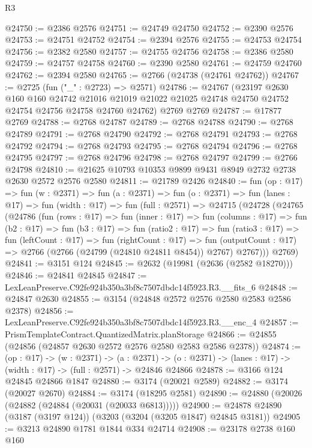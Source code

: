 \begin{lexlean}{R3}
\begin{coremodule}
@24750 := @2386 @2576
@24751 := @24749 @24750
@24752 := @2390 @2576
@24753 := @24751 @24752
@24754 := @2394 @2576
@24755 := @24753 @24754
@24756 := @2382 @2580
@24757 := @24755 @24756
@24758 := @2386 @2580
@24759 := @24757 @24758
@24760 := @2390 @2580
@24761 := @24759 @24760
@24762 := @2394 @2580
@24765 := @2766 (@24738 (@24761 @24762))
@24767 := @2725 (fun ("_" : @2723) => @2571)
@24786 := @24767
    (@23197
      @2630
      @160
      @160
      @24742
      @21016
      @21019
      @21022
      @21025
      @24748
      @24750
      @24752
      @24754
      @24756
      @24758
      @24760
      @24762)
    @2769
    @2769
@24787 := @17877 @2769
@24788 := @2768 @24787
@24789 := @2768 @24788
@24790 := @2768 @24789
@24791 := @2768 @24790
@24792 := @2768 @24791
@24793 := @2768 @24792
@24794 := @2768 @24793
@24795 := @2768 @24794
@24796 := @2768 @24795
@24797 := @2768 @24796
@24798 := @2768 @24797
@24799 := @2766 @24798
@24810 := @21625 @10793 @10353 @9899 @9431 @8949 @2732 @2738 @2630 @2572 @2576 @2580
@24811 := @21789 @2426
@24840 := fun (op : @17) =>
  fun (w : @2371) =>
  fun (a : @2371) =>
  fun (o : @2371) =>
  fun (lanes : @17) =>
  fun (width : @17) =>
  fun (full : @2571) =>
  @24715
    (@24728
      (@24765
        (@24786
          (fun (rows : @17) =>
          fun (inner : @17) =>
          fun (columns : @17) =>
          fun (b2 : @17) =>
          fun (b3 : @17) =>
          fun (ratio2 : @17) =>
          fun (ratio3 : @17) =>
          fun (leftCount : @17) =>
          fun (rightCount : @17) =>
          fun (outputCount : @17) => @2766 (@2766 (@24799 (@24810 @24811 @8454)) @2767) @2767)))
      @2769)
@24841 := @3151 @124
@24845 := @2632 (@19981 (@2636 (@2582 @18270)))
@24846 := @24841 @24845
@24847 := LexLeanPreserve.C92fe924b350a3bf8c7507dbdc14f5923.R3.__fits_6
@24848 := @24847 @2630
@24855 := @3154 (@24848 @2572 @2576 @2580 @2583 @2586 @2378)
@24856 := LexLeanPreserve.C92fe924b350a3bf8c7507dbdc14f5923.R3.__enc_4
@24857 := PrismTemplateContract.QuantizedMatrix.planStorage
@24866 := @24855 (@24856 (@24857 @2630 @2572 @2576 @2580 @2583 @2586 @2378))
@24874 := (op : @17) ->
  (w : @2371) ->
  (a : @2371) -> (o : @2371) -> (lanes : @17) -> (width : @17) -> (full : @2571) -> @24846 @24866
@24878 := @3166 @124 @24845 @24866 @1847
@24880 := @3174 (@20021 @2589)
@24882 := @3174 (@20027 @2670)
@24884 := @3174 (@18295 @2581)
@24890 := @24880 (@20026 (@24882 (@24884 (@20031 (@20033 @6813)))))
@24900 := @24878 @24890 (@3187 (@3197 @124)) (@3203 (@3204 (@3205 @1847) @24845 @3181))
@24905 := @3213 @24890 @1781 @1844 @334 @24714
@24908 := @23178 @2738 @160 @160

\end{coremodule}
\end{lexlean}
